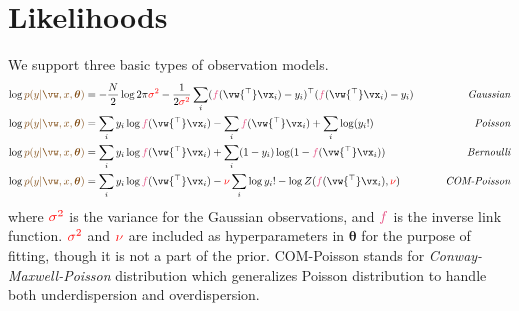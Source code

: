 \documentclass{article}
\newcounter{ct}
\newcommand{\trp}{{^\top}} %
\newcommand{\inverseLink}{\ensuremath{\textcolor{awesome}{f}}}
\newcommand{\weight}{\vw}
\newcommand{\hyp}{\bm{\theta}}
\newcommand{\likelihood}{\ensuremath{\textcolor{goldenbrown}{p(y|\weight,x,\hyp)}}}
\begin{document}
\section{Likelihoods}
We support three basic types of observation models.
\begin{align}
    \log\likelihood &= 
	-\frac{N}{2}\log2\pi\textcolor{red}{\sigma^2}
	- \frac{1}{2\textcolor{red}{\sigma^2}} 
	\sum_i
	    (\inverseLink(\weight\trp\vx_i) - y_i)\trp
	    (\inverseLink(\weight\trp\vx_i) - y_i) 
	\qquad 
	&\text{\it Gaussian}
    \label{eq:likelihood:Gaussian}
    \\
    \log\likelihood &= 
	\sum_i y_i \log \inverseLink(\weight\trp\vx_i)
	-
	\sum_i \inverseLink(\weight\trp\vx_i)
	+ \sum_i \log(y_i!)
	\qquad 
	&\text{\it Poisson}
    \label{eq:likelihood:Poisson}
    \\
    \log\likelihood &= 
	\sum_i
	y_i \log\inverseLink(\weight\trp\vx_i)
	+
	\sum_i
	(1-y_i) \log (1-\inverseLink(\weight\trp\vx_i))
	\qquad
	&\text{\it Bernoulli}
    \label{eq:likelihood:Bernoulli}
    \\
    \log\likelihood &= 
	\sum_i
	y_i \log\inverseLink(\weight\trp\vx_i) 
	- \textcolor{red}{\nu} \sum_i \log y_i!
	- \log Z(\inverseLink(\weight\trp\vx_i), \textcolor{red}{\nu})
	&\text{\it COM-Poisson}
    \label{eq:likelihood:COM}
\end{align}
where $\textcolor{red}{\sigma^2}$ is the variance for the Gaussian observations, and $\inverseLink$ is the inverse link function.
$\textcolor{red}{\sigma^2}$ and $\textcolor{red}{\nu}$ are included as hyperparameters in $\hyp$ for the purpose of fitting, though it is not a part of the prior.
COM-Poisson stands for {\it Conway-Maxwell-Poisson} distribution which generalizes Poisson distribution to handle both underdispersion and overdispersion.
\end{document}
